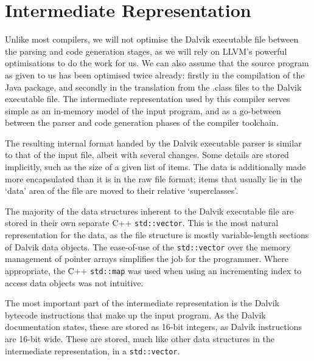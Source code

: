 \section{Intermediate Representation}
\label{sec:irep}

Unlike most compilers, we will not optimise the Dalvik executable file between the parsing and code generation stages, as we will rely on LLVM's powerful optimisations to do the work for us. We can also assume that the source program as given to us has been optimised twice already: firstly in the compilation of the Java package, and secondly in the translation from the .class files to the Dalvik executable file. The intermediate representation used by this compiler serves simple as an in-memory model of the input program, and as a go-between between the parser and code generation phases of the compiler toolchain.

The resulting internal format handed by the Dalvik executable parser is similar to that of the input file, albeit with several changes. Some details are stored implicitly, such as the size of a given list of items. The data is additionally made more encapsulated than it is in the raw file format; items that usually lie in the `data' area of the file are moved to their relative `superclasses'.

The majority of the data structures inherent to the Dalvik executable file are stored in their own separate C++ \verb|std::vector|. This is the most natural representation for the data, as the file structure is mostly variable-length sections of Dalvik data objects. The ease-of-use of the \verb|std::vector| over the memory management of pointer arrays simplifies the job for the programmer. Where appropriate, the C++ \verb|std::map| was used when using an incrementing index to access data objects was not intuitive.

The most important part of the intermediate representation is the Dalvik bytecode instructions that make up the input program. As the Dalvik documentation states, these are stored as 16-bit integers, as Dalvik instructions are 16-bit wide. These are stored, much like other data structures in the intermediate representation, in a \verb|std::vector|.
